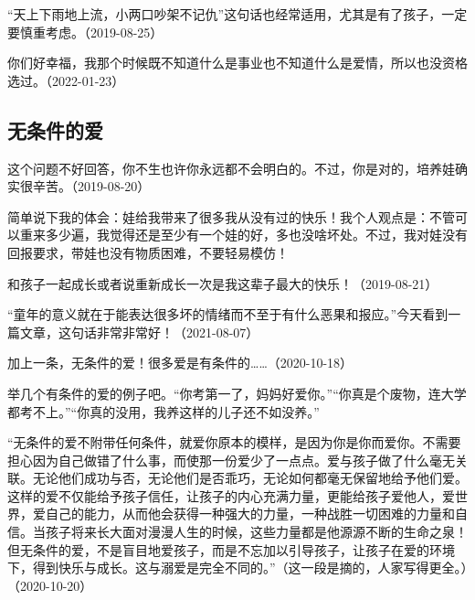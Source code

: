 “天上下雨地上流，小两口吵架不记仇”这句话也经常适用，尤其是有了孩子，一定要慎重考虑。（2019-08-25）


你们好幸福，我那个时候既不知道什么是事业也不知道什么是爱情，所以也没资格选过。（2022-01-23）

\subsection{无条件的爱}


这个问题不好回答，你不生也许你永远都不会明白的。不过，你是对的，培养娃确实很辛苦。（2019-08-20）

简单说下我的体会：娃给我带来了很多我从没有过的快乐！我个人观点是：不管可以重来多少遍，我觉得还是至少有一个娃的好，多也没啥坏处。不过，我对娃没有回报要求，带娃也没有物质困难，不要轻易模仿！

和孩子一起成长或者说重新成长一次是我这辈子最大的快乐！（2019-08-21）

“童年的意义就在于能表达很多坏的情绪而不至于有什么恶果和报应。”今天看到一篇文章，这句话非常非常好！（2021-08-07）


加上一条，无条件的爱！很多爱是有条件的……（2020-10-18）


举几个有条件的爱的例子吧。“你考第一了，妈妈好爱你。”“你真是个废物，连大学都考不上。”“你真的没用，我养这样的儿子还不如没养。”

“无条件的爱不附带任何条件，就爱你原本的模样，是因为你是你而爱你。不需要担心因为自己做错了什么事，而使那一份爱少了一点点。爱与孩子做了什么毫无关联。无论他们成功与否，无论他们是否乖巧，无论如何都毫无保留地给予他们爱。这样的爱不仅能给予孩子信任，让孩子的内心充满力量，更能给孩子爱他人，爱世界，爱自己的能力，从而他会获得一种强大的力量，一种战胜一切困难的力量和自信。当孩子将来长大面对漫漫人生的时候，这些力量都是他源源不断的生命之泉！但无条件的爱，不是盲目地爱孩子，而是不忘加以引导孩子，让孩子在爱的环境下，得到快乐与成长。这与溺爱是完全不同的。”（这一段是摘的，人家写得更全。）（2020-10-20）


